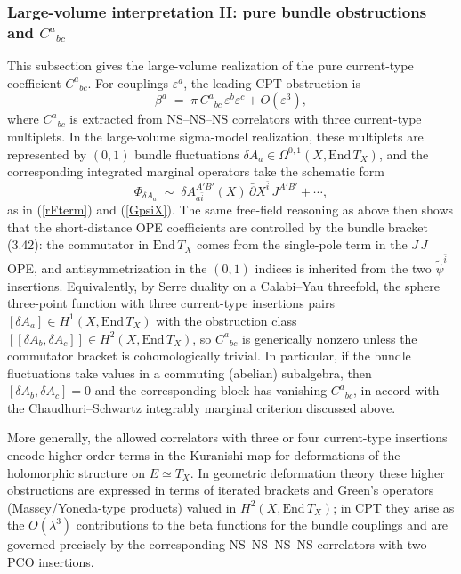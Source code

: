 \documentclass[12pt]{article}
\newcommand{\wt}[1]{\widetilde{#1}}
\begin{document}
		\subsubsection{Large-volume interpretation II: pure bundle obstructions and $C^{a}{}_{bc}$}
		
		This subsection gives the large-volume realization of the pure current-type coefficient $C^{a}{}_{bc}$. For couplings $\varepsilon^a$, the leading CPT obstruction is
		\[
		\beta^a\;=\;\pi\,C^{a}{}_{bc}\,\varepsilon^b\varepsilon^c+O(\varepsilon^3),
		\]
			where $C^{a}{}_{bc}$ is extracted from NS--NS--NS correlators with three current-type multiplets. In the large-volume sigma-model realization, these multiplets are represented by $(0,1)$ bundle fluctuations $\delta A_a\in\Omega^{0,1}(X,\mathrm{End}\,T_X)$, and the corresponding integrated marginal operators take the schematic form
		\[
		\Phi_{\delta A_a}\;\sim\;\delta A_{a\bar i}^{A'B'}(X)\,\bar\partial X^{\bar i}\,J^{A'B'}+\cdots,
		\]
			as in (\ref{rFterm}) and (\ref{GpsiX}). The same free-field reasoning as above then shows that the short-distance OPE coefficients are controlled by the bundle bracket (3.42): the commutator in $\mathrm{End}\,T_X$ comes from the single-pole term in the $J\,J$ OPE, and antisymmetrization in the $(0,1)$ indices is inherited from the two $\wt\psi^{\bar i}$ insertions. Equivalently, by Serre duality on a Calabi--Yau threefold, the sphere three-point function with three current-type insertions pairs $[\delta A_a]\in H^{1}(X,\mathrm{End}\,T_X)$ with the obstruction class $[[\delta A_b,\delta A_c]]\in H^{2}(X,\mathrm{End}\,T_X)$, so $C^{a}{}_{bc}$ is generically nonzero unless the commutator bracket is cohomologically trivial. In particular, if the bundle fluctuations take values in a commuting (abelian) subalgebra, then $[\delta A_b,\delta A_c]=0$ and the corresponding block has vanishing $C^{a}{}_{bc}$, in accord with the Chaudhuri--Schwartz integrably marginal criterion discussed above.
		
		More generally, the allowed correlators with three or four current-type insertions encode higher-order terms in the Kuranishi map for deformations of the holomorphic structure on $E\simeq T_X$. In geometric deformation theory these higher obstructions are expressed in terms of iterated brackets and Green's operators (Massey/Yoneda-type products) valued in $H^{2}(X,\mathrm{End}\,T_X)$; in CPT they arise as the $O(\lambda^3)$ contributions to the beta functions for the bundle couplings and are governed precisely by the corresponding NS--NS--NS--NS correlators with two PCO insertions.
	
\end{document}
